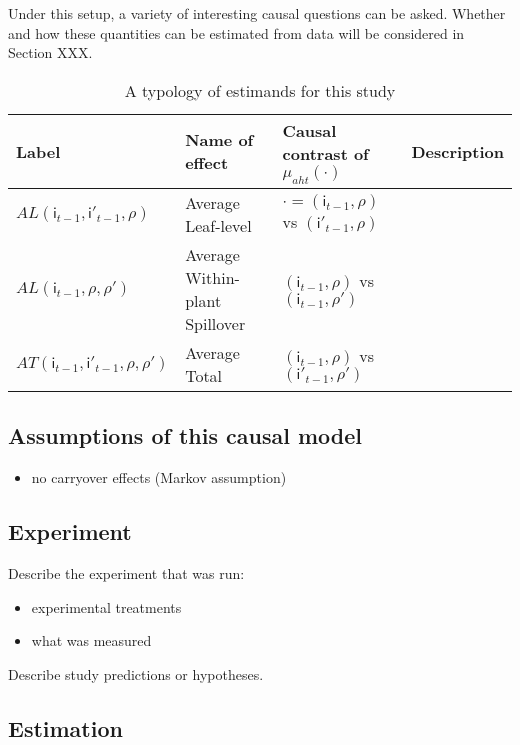 \documentclass[]{article}
\providecommand{\tightlist}{%
  \setlength{\itemsep}{0pt}\setlength{\parskip}{0pt}}
\begin{document}
Under this setup, a variety of interesting causal questions can be
asked. Whether and how these quantities can be estimated from data will
be considered in Section XXX.

\begin{table}[H]
\caption{A typology of estimands for this study}
\label{tab:estimands}
\begin{tabular}{llll}
Label & Name of effect &  Causal contrast of $\mu_{aht}(\cdot)$ & Description \\
\hline
$AL(\mathsf{i}_{t-1}, \mathsf{i}'_{t-1}, \rho)$ & Average Leaf-level &  $\cdot = (\mathsf{i}_{t-1}, \rho)$ vs $(\mathsf{i}'_{t-1}, \rho)$ & \\
$AL(\mathsf{i}_{t-1}, \rho, \rho')$ & Average Within-plant Spillover & $(\mathsf{i}_{t-1}, \rho)$ vs $(\mathsf{i}_{t-1}, \rho')$ & \\
$AT(\mathsf{i}_{t-1}, \mathsf{i}'_{t-1}, \rho, \rho')$  & Average Total & $(\mathsf{i}_{t-1}, \rho)$ vs $(\mathsf{i}'_{t-1}, \rho')$ & \\
\end{tabular}
\end{table}

\hypertarget{assumptions-of-this-causal-model}{%
\subsection{Assumptions of this causal
model}\label{assumptions-of-this-causal-model}}

\begin{itemize}
\tightlist
\item
  no carryover effects (Markov assumption)
\end{itemize}

\hypertarget{experiment}{%
\subsection{Experiment}\label{experiment}}

Describe the experiment that was run:

\begin{itemize}
\tightlist
\item
  experimental treatments
\item
  what was measured
\end{itemize}

Describe study predictions or hypotheses.

\hypertarget{estimation}{%
\subsection{Estimation}\label{estimation}}
\end{document}
